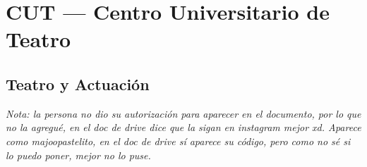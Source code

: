 \section{CUT --- Centro Universitario de Teatro}

\subsection{Teatro y Actuación}
\sincodigo

\textit{Nota: la persona no dio su autorización para aparecer en el documento, por lo que no la agregué, en el doc de drive dice que la sigan en instagram mejor xd. Aparece como majoopastelito, en el doc de drive sí aparece su código, pero como no sé si lo puedo poner, mejor no lo puse.}
